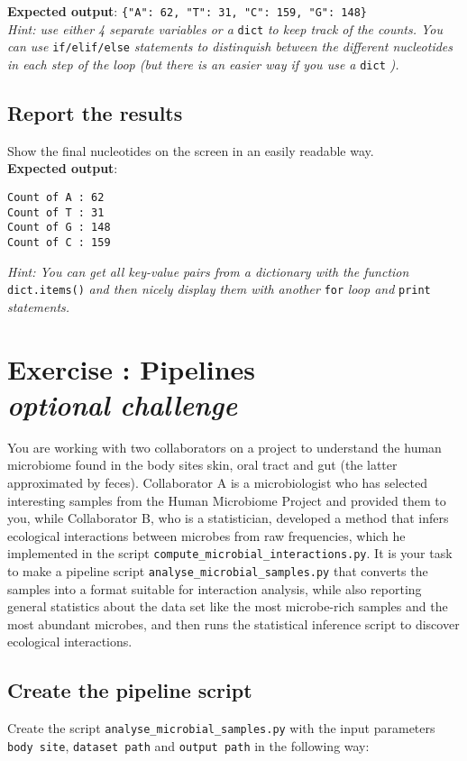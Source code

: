 \documentclass[12pt]{article}
\begin{document}
\noindent\textbf{Expected output}: \verb|{"A": 62, "T": 31, "C": 159, "G": 148}|\\

\noindent\emph{Hint: use either 4 separate variables or a} \texttt{dict} \emph{to keep track of the counts. You can use} \texttt{if/elif/else} \emph{statements to distinquish between the different nucleotides in each step of the loop (but there is an easier way if you use a} \texttt{dict} \emph{).}

\subsection{Report the results}
Show the final nucleotides on the screen in an easily readable way.\\

\noindent\textbf{Expected output}:
\begin{verbatim}
Count of A : 62
Count of T : 31
Count of G : 148
Count of C : 159
\end{verbatim}

\noindent\emph{Hint: You can get all key-value pairs from a dictionary with the function} \texttt{dict.items()} \emph{and then nicely display them with another} \texttt{for} \emph{loop and} \texttt{print} \emph{statements.}

\section{Exercise : Pipelines \\ \emph{\color{red} optional challenge}}
You are working with two collaborators on a project to understand the human microbiome found in the body sites skin, oral tract and gut (the latter approximated by feces). Collaborator A is a microbiologist who has selected interesting samples from the Human Microbiome Project and provided them to you, while Collaborator B, who is a statistician, developed a method that infers ecological interactions between microbes from raw frequencies, which he implemented in the script \texttt{compute\_microbial\_interactions.py}. It is your task to make a pipeline script \texttt{analyse\_microbial\_samples.py} that converts the samples into a format suitable for interaction analysis, while also reporting general statistics about the data set like the most microbe-rich samples and the most abundant microbes, and then runs the statistical inference script to discover ecological interactions.


\subsection{Create the pipeline script}
Create the script \texttt{analyse\_microbial\_samples.py} with the input parameters \texttt{body site}, \texttt{dataset path} and \texttt{output path} in the following way:\\
\end{document}
